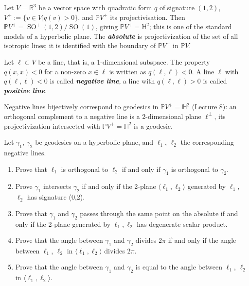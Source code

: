 \documentclass{article}
\newcommand{\R}{\mathbb{R}}
\renewcommand{\P}{\mathbb{P}}
\renewcommand{\H}{\mathbb{H}}
\DeclareMathOperator{\SO}{SO}
\begin{document}
\begin{remark}
	Let $V = \R^3$ be a vector space with quadratic form $q$ of signature $(1,2)$, $V^+:=\{v\in V|q(v)>0\}$, and $\P V^+$ its projectivisation. Then $\P V^+=\SO^+(1,2)/\SO(1)$, giving $\P V^+= \H^2$; this is one of the standard models of a hyperbolic plane. The \textbf{\textit{absolute}} is projectivization of the set of all isotropic lines; it is identified with the boundary of $\P V^+$ in $\P V$.
\end{remark}
\begin{defn}
	Let $\ell \subset V$ be a line, that is, a 1-dimensional subspace. The property $q(x,x)<0$ for a non-zero $x\in\ell$ is written as $q(\ell,\ell)<0$. A line $\ell$ with $q(\ell,\ell)<0$ is called \textbf{\textit{negative line}}, a line with $q(\ell,\ell) > 0$ is called \textbf{\textit{positive line}}.
\end{defn}
\begin{remark}
	Negative lines bijectively correspond to geodesics in $\P V^+ = \H^2$ (Lecture 8): an orthogonal complement to a negative line is a 2-dimensional plane $\ell^\perp$, its projectivization intersected with $\P V^+ = \H^2$ is a geodesic.
\end{remark}
\begin{exercise}
	 Let $\gamma_1$, $\gamma_2$ be geodesics on a hyperbolic plane, and $\ell_1$, $\ell_2$ the corresponding negative lines.
\end{exercise}
\begin{enumerate}[label*=\alph*.]
	\item Prove that $\ell_1$ is orthogonal to $\ell_2$ if and only if $\gamma_1$ is orthogonal to $\gamma_2$.
	\item Prove $\gamma_1$ intersects $\gamma_2$ if and only if the 2-plane $\langle\ell_1,\ell_2\rangle$ generated by $\ell_1$, $\ell_2$ has
	signature (0,2).
	
	\item Prove that $\gamma_1$ and $\gamma_2$ passes through the same point on the absolute if and only if
	the 2-plane generated by $\ell_1,\ell_2$ has degenerate scalar product.
	
	\item Prove that the angle between $\gamma_1$ and $\gamma_2$ divides $2\pi$ if and only if the angle between $\ell_1$, $\ell_2$ in $\langle\ell_1,\ell_2\rangle$ divides $2\pi$.
	
	\item Prove that the angle between $\gamma_1$ and $\gamma_2$ is equal to the angle between $\ell_1$, $\ell_2$ in $\langle\ell_1,\ell_2\rangle$.
\end{enumerate}
\end{document}
